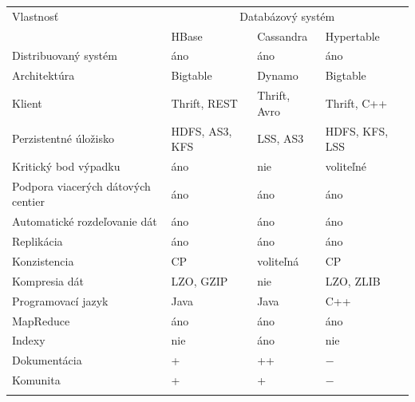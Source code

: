 \documentclass[11pt,twoside,a4paper]{book}
\begin{document}
{\centering\par\bigskip
\begin{tabular}{l@{\hspace{2.5em}}lll}\toprule
Vlastnosť & \multicolumn{3}{c}{Databázový systém} \\
			& \multicolumn{1}{l}{HBase} & \multicolumn{1}{l}{Cassandra} & \multicolumn{1}{l}{Hypertable}\\\midrule\addlinespace

Distribuovaný systém	& áno  & áno & áno 				\\\addlinespace
Architektúra		& Bigtable  & Dynamo & Bigtable	\\\addlinespace
Klient 			& Thrift, REST  & Thrift, Avro & Thrift, C++ 	\\\addlinespace
Perzistentné úložisko	& HDFS, AS3\footnotemark[4], KFS  & LSS\footnotemark[5], AS3 & HDFS, KFS, LSS		\\\addlinespace
Kritický bod výpadku	& áno  & nie & voliteľné\footnotemark[6] 	\\\addlinespace
Podpora viacerých dátových centier & áno  & áno & áno 			\\\addlinespace
Automatické rozdeľovanie dát 	& áno  & áno & áno 			\\\addlinespace
Replikácia 		& áno  & áno & áno 				\\\addlinespace
Konzistencia 		& CP  & voliteľná & CP 				\\\addlinespace
Kompresia dát		& LZO, GZIP  & nie & LZO, ZLIB 				\\\addlinespace
Programovací jazyk 	& Java  & Java & C++ 				\\\addlinespace
MapReduce 		& áno  & áno & áno 				\\\addlinespace
Indexy		 	& nie  & áno  & nie 					\\\addlinespace
Dokumentácia		& +  & ++  & $-$ 					\\\addlinespace
Komunita 		& +  & +  & $-$ 					\\\addlinespace\bottomrule

\end{tabular}\\}

\label{tab:Nosql}
\par\bigskip

\end{document}
